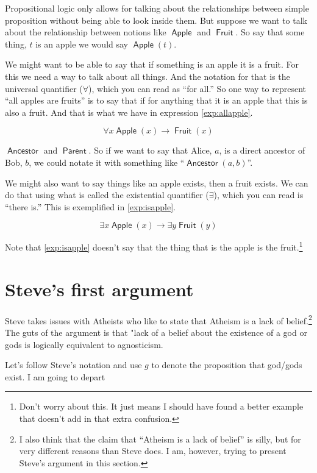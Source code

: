 \documentclass[12pt]{article}
\providecommand{\lif}{\rightarrow}
\providecommand{\lall}{\forall}
\providecommand{\lis}{\exists}
\newcommand{\rel}[1]{\ensuremath{\mathop{\mathsf{#1}}}}
\newcommand{\rlan}{\rel{Ancestor}}
\newcommand{\rlpt}{\rel{Parent}}
\newcommand{\rlapple}{\rel{Apple}}
\newcommand{\rlfruit}{\rel{Fruit}}
\begin{document}
Propositional logic only allows for talking about the relationships between simple proposition without being able to look inside them.
But suppose we want to talk about the relationship between notions like $\rlapple$ and $\rlfruit$. So say that some thing, $t$ is an apple we would say $\rlapple(t)$.

We might want to be able to say that if something is an apple it is a fruit.
For this we need a way to talk about all things. And the notation for that is the universal quantifier ($\lall$), which you can read as “for all.” So one way to represent “all apples are fruits” is to say that if for anything that it is an apple that this is also a fruit. And that is what we have in expression \ref{exp:allapple}.

\begin{equation}\label{exp:allapple}
    \lall x \rlapple(x) \lif \rlfruit(x)
\end{equation}

$\rlan$ and $\rlpt$. So if we want to say that Alice, $a$, is a direct ancestor of Bob, $b$, we could notate it with something like “$\rlan(a, b)$”.

We might also want to say things like an apple exists, then a fruit exists.
We can do that using what is called the existential quantifier ($\lis$), which you can read is “there is.” This is exemplified in \ref{exp:isapple}.

\begin{equation}\label{exp:isapple}
    \lis x \rlapple(x) \lif \lis y \rlfruit(y)
\end{equation}

Note that \ref{exp:isapple} doesn't say that the thing that is the apple is the fruit.\footnote{Don't worry about this. It just means I should have found a better example that doesn't add in that extra confusion.}

\section{Steve's first argument}

Steve takes issues with Atheists who like to state that Atheism is a lack of belief.\footnote{I also think that the claim that “Atheism is a lack of belief” is silly, but for very different reasons than Steve does. I am, however, trying to present Steve's argument in this section.}
The guts of the argument is that "lack of a belief about the existence of a god or gods is logically equivalent to agnosticism.

Let's follow Steve's notation and use $g$ to denote the proposition that god/gods exist. I am going to depart
\end{document}
